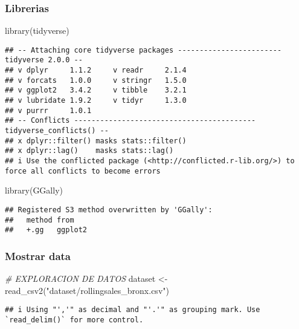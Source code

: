 \documentclass[
]{article}
\newenvironment{Shaded}{\begin{snugshade}}{\end{snugshade}}
\newcommand{\CommentTok}[1]{\textcolor[rgb]{0.56,0.35,0.01}{\textit{#1}}}
\newcommand{\FunctionTok}[1]{\textcolor[rgb]{0.00,0.00,0.00}{#1}}
\newcommand{\NormalTok}[1]{#1}
\newcommand{\OtherTok}[1]{\textcolor[rgb]{0.56,0.35,0.01}{#1}}
\newcommand{\StringTok}[1]{\textcolor[rgb]{0.31,0.60,0.02}{#1}}
\begin{document}
\hypertarget{librerias}{%
\subsubsection{Librerias}\label{librerias}}

\begin{Shaded}
\begin{Highlighting}[]
\FunctionTok{library}\NormalTok{(tidyverse)}
\end{Highlighting}
\end{Shaded}

\begin{verbatim}
## -- Attaching core tidyverse packages ------------------------ tidyverse 2.0.0 --
## v dplyr     1.1.2     v readr     2.1.4
## v forcats   1.0.0     v stringr   1.5.0
## v ggplot2   3.4.2     v tibble    3.2.1
## v lubridate 1.9.2     v tidyr     1.3.0
## v purrr     1.0.1     
## -- Conflicts ------------------------------------------ tidyverse_conflicts() --
## x dplyr::filter() masks stats::filter()
## x dplyr::lag()    masks stats::lag()
## i Use the conflicted package (<http://conflicted.r-lib.org/>) to force all conflicts to become errors
\end{verbatim}

\begin{Shaded}
\begin{Highlighting}[]
\FunctionTok{library}\NormalTok{(GGally)}
\end{Highlighting}
\end{Shaded}

\begin{verbatim}
## Registered S3 method overwritten by 'GGally':
##   method from   
##   +.gg   ggplot2
\end{verbatim}

\hypertarget{mostrar-data}{%
\subsubsection{Mostrar data}\label{mostrar-data}}

\begin{Shaded}
\begin{Highlighting}[]
\CommentTok{\# EXPLORACION DE DATOS}
\NormalTok{dataset }\OtherTok{\textless{}{-}} \FunctionTok{read\_csv2}\NormalTok{(}\StringTok{"dataset/rollingsales\_bronx.csv"}\NormalTok{)}
\end{Highlighting}
\end{Shaded}

\begin{verbatim}
## i Using "','" as decimal and "'.'" as grouping mark. Use `read_delim()` for more control.
\end{verbatim}
\end{document}
